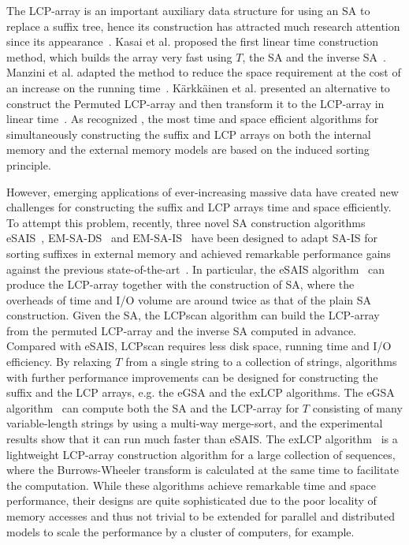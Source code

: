 \documentclass[10pt,journal,compsoc]{IEEEtran}
\begin{document}
\begin{CJK*}{GBK}{song}
{The LCP-array is an important auxiliary data structure for using an SA to replace a suffix tree, hence its construction has attracted much research attention since its appearance~\cite{Manber1993}. Kasai et al. proposed the first linear time construction method, which builds the array very fast using $T$, the SA and the inverse SA~\cite{Kasai2001}. Manzini et al. adapted the method to reduce the space requirement at the cost of an increase on the running time~\cite{Manzini2004-2}. K\"{a}rkk\"{a}inen et al. presented an alternative to construct the Permuted LCP-array and then transform it to the LCP-array in linear time~\cite{Karkkainen2009}. As recognized \cite{Fischer11,Bingmann12}, the most time and space efficient algorithms for simultaneously constructing the suffix and LCP arrays on both the internal memory and the external memory models are based on the induced sorting principle.
}

However, emerging applications of ever-increasing massive data have created new challenges for constructing the suffix and LCP arrays time and space efficiently. To attempt this problem, recently, three novel SA construction algorithms eSAIS~\cite{Bingmann12}, EM-SA-DS~\cite{Nong14} and EM-SA-IS~\cite{Nong15} have been designed to adapt SA-IS for sorting suffixes in external memory and achieved remarkable performance gains against the previous state-of-the-art~\cite{Dementiev08}. In particular, the eSAIS algorithm~\cite{Bingmann12} can produce the LCP-array together with the construction of SA, where the overheads of time and I/O volume are around twice as that of the plain SA construction. Given the SA, the LCPscan algorithm \cite{Juha2014} can build the LCP-array from the permuted LCP-array and the inverse SA computed in advance. Compared with eSAIS, LCPscan requires less disk space, running time and I/O efficiency.
By relaxing $T$ from a single string to a collection of strings, algorithms with further performance improvements can be designed for constructing the suffix and the LCP arrays, e.g. the eGSA and the exLCP algorithms. The eGSA algorithm~\cite{Felipe2013} can compute both the SA and the LCP-array for $T$ consisting of many variable-length strings by using a multi-way merge-sort, and the experimental results show that it can run much faster than eSAIS.  The exLCP algorithm~\cite{Markus2012} is a lightweight LCP-array construction algorithm for a large collection of sequences, where the Burrows-Wheeler transform is calculated at the same time to facilitate the computation. While these algorithms achieve remarkable time and space performance, their designs are quite sophisticated due to the poor locality of memory accesses and thus not trivial to be extended for parallel and distributed models to scale the performance by a cluster of computers, for example.



\end{CJK*}
\end{document}

